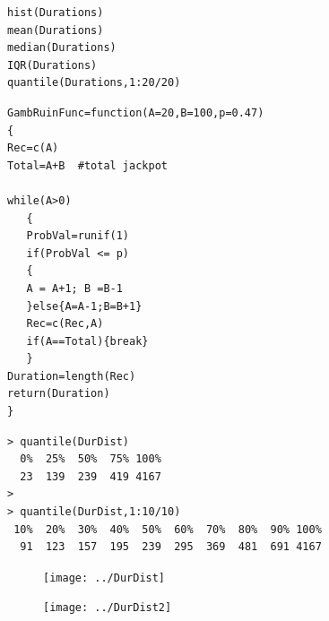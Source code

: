 \documentclass[11pt]{article} %
\begin{document}
\begin{framed}
\begin{verbatim}
hist(Durations)
mean(Durations)
median(Durations)
IQR(Durations)
quantile(Durations,1:20/20)
\end{verbatim}
\end{framed}


\newpage
\begin{framed}

\begin{verbatim}
GambRuinFunc=function(A=20,B=100,p=0.47)
{
Rec=c(A)
Total=A+B  #total jackpot

while(A>0)
   { 
   ProbVal=runif(1)
   if(ProbVal <= p)
   {
   A = A+1; B =B-1
   }else{A=A-1;B=B+1}
   Rec=c(Rec,A)
   if(A==Total){break}
   }
Duration=length(Rec)
return(Duration)
}
\end{verbatim}
\end{framed}
\begin{verbatim}
> quantile(DurDist)
  0%  25%  50%  75% 100% 
  23  139  239  419 4167 
> 
> quantile(DurDist,1:10/10)
 10%  20%  30%  40%  50%  60%  70%  80%  90% 100% 
  91  123  157  195  239  295  369  481  691 4167 
\end{verbatim}
\newpage
\begin{figure}[h!]
\centering
\texttt{[image: ../DurDist]}
\caption{}
\end{figure}
\begin{figure}[h!]
\centering
\texttt{[image: ../DurDist2]}
\caption{}
\label{Same - Without Upper Tail}
\end{figure}
\end{document}
